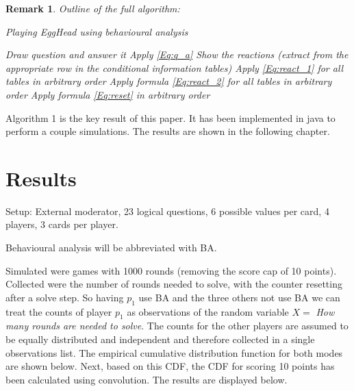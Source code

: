 \documentclass{article}
\newtheorem{remark}{Remark}[section]
\begin{document}
\begin{remark}

Outline of the full algorithm:

\begin{algorithm}
\caption{Playing EggHead using behavioural analysis}
\label{alg:game_process}
\begin{algorithmic}[1]
    \STATE Draw question and answer it
    \STATE Apply \cref{Eq:q_a}
    \REPEAT
        \STATE Show the reactions (extract from the appropriate row in the conditional information tables)
        \STATE Apply \cref{Eq:react_1} for all tables in arbitrary order
        \STATE Apply formula \cref{Eq:react_2} for all tables in arbitrary order
            \STATE Apply formula \cref{Eq:reset} in arbitrary order
        \ENDIF
\ENDWHILE
\end{algorithmic}
\end{algorithm}

\end{remark}

Algorithm 1 is the key result of this paper. It has been implemented in java to perform a couple simulations. The results are shown in the following chapter.

\section{Results}

Setup: External moderator, 23 logical questions, 6 possible values per card, 4 players, 3 cards per player. 

Behavioural analysis will be abbreviated with BA.

Simulated were games with 1000 rounds (removing the score cap of 10 points). Collected were the number of rounds needed to solve, with the counter resetting after a solve step. So having $p_1$ use BA and the three others not use BA we can treat the counts of player $p_1$ as observations of the random variable $X=$ \textit{How many rounds are needed to solve}. The counts for the other players are assumed to be equally distributed and independent and therefore collected in a single observations list.
The empirical cumulative distribution function for both modes are shown below. Next, based on this CDF, the CDF for scoring 10 points has been calculated using convolution. The results are displayed below.
    
\end{document}

